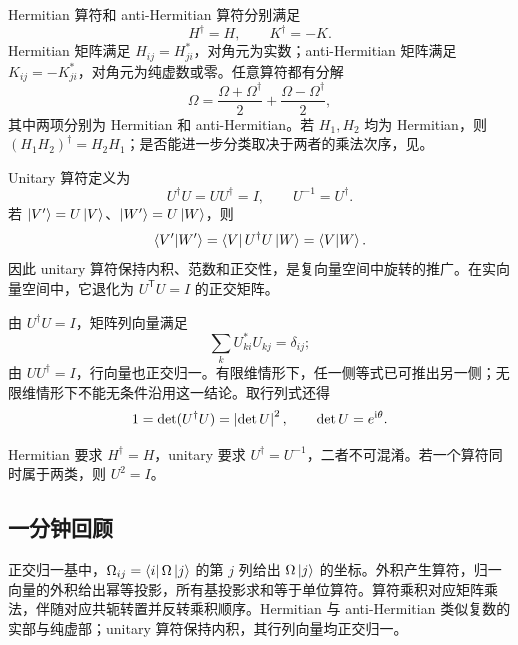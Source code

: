 
Hermitian 算符和 anti-Hermitian 算符分别满足
\begin{equation}
  H^\dagger=H,
  \qquad
  K^\dagger=-K.
  \label{eq:QM-C01-S06-hermitian-definitions}
\end{equation}
Hermitian 矩阵满足 $H_{ij}=H_{ji}^*$，对角元为实数；anti-Hermitian 矩阵满足 $K_{ij}=-K_{ji}^*$，对角元为纯虚数或零。任意算符都有分解
\begin{equation}
  \Omega
  =\frac{\Omega+\Omega^\dagger}{2}
  +\frac{\Omega-\Omega^\dagger}{2},
  \label{eq:QM-C01-S06-hermitian-decomposition}
\end{equation}
其中两项分别为 Hermitian 和 anti-Hermitian。若 $H_1,H_2$ 均为 Hermitian，则 $(H_1H_2)^\dagger=H_2H_1$；是否能进一步分类取决于两者的乘法次序，见。


Unitary 算符定义为
\begin{equation}
  U^\dagger U=UU^\dagger=I,
  \qquad
  U^{-1}=U^\dagger.
  \label{eq:QM-C01-S06-unitary-definition}
\end{equation}
若 $\left|V'\right\rangle=U\left|V\right\rangle$、$\left|W'\right\rangle=U\left|W\right\rangle$，则
\begin{equation}
  \left\langle V' \middle| W' \right\rangle
  =\left\langle V\right|U^\dagger U\left|W\right\rangle
  =\left\langle V \middle| W \right\rangle.
  \label{eq:QM-C01-S06-unitary-inner-product}
\end{equation}
因此 unitary 算符保持内积、范数和正交性，是复向量空间中旋转的推广。在实向量空间中，它退化为 $U^{\mathsf T}U=I$ 的正交矩阵。

由 $U^\dagger U=I$，矩阵列向量满足
\begin{equation}
  \sum_kU_{ki}^*U_{kj}=\delta_{ij};
  \label{eq:QM-C01-S06-unitary-columns}
\end{equation}
由 $UU^\dagger=I$，行向量也正交归一。有限维情形下，任一侧等式已可推出另一侧；无限维情形下不能无条件沿用这一结论。取行列式还得
\[
  1=\det(U^\dagger U)=\left|\det U\right|^2,
  \qquad
  \det U=e^{\mathrm{i}\theta}.
\]

Hermitian 要求 $H^\dagger=H$，unitary 要求 $U^\dagger=U^{-1}$，二者不可混淆。若一个算符同时属于两类，则 $U^2=I$。

\subsection{一分钟回顾}

正交归一基中，$\Omega_{ij}=\left\langle i\right|\Omega\left|j\right\rangle$ 的第 $j$ 列给出 $\Omega\left|j\right\rangle$ 的坐标。外积产生算符，归一向量的外积给出幂等投影，所有基投影求和等于单位算符。算符乘积对应矩阵乘法，伴随对应共轭转置并反转乘积顺序。Hermitian 与 anti-Hermitian 类似复数的实部与纯虚部；unitary 算符保持内积，其行列向量均正交归一。

